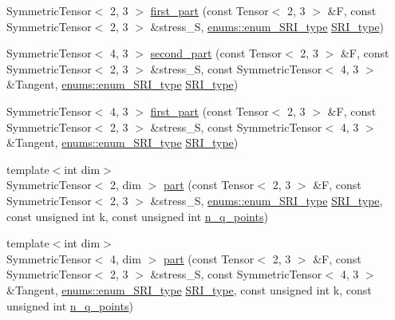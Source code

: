 \begin{DoxyCompactItemize}
\item 
Symmetric\+Tensor$<$ 2, 3 $>$ \hyperlink{namespaceSRI_a99b236a4dfdbad69d9bc9473d1110801}{first\+\_\+part} (const Tensor$<$ 2, 3 $>$ \&F, const Symmetric\+Tensor$<$ 2, 3 $>$ \&stress\+\_\+S, \hyperlink{namespaceenums_ad159a7d6539f111883db3b07c09601a8}{enums\+::enum\+\_\+\+S\+R\+I\+\_\+type} \hyperlink{assembly__routine__SRI_8cc_a163566963ded80f68a5bbc6d04ce0adf}{S\+R\+I\+\_\+type})
\item 
Symmetric\+Tensor$<$ 4, 3 $>$ \hyperlink{namespaceSRI_a59dcf1c9d3d602b0d3d3044c23cb2f10}{second\+\_\+part} (const Tensor$<$ 2, 3 $>$ \&F, const Symmetric\+Tensor$<$ 2, 3 $>$ \&stress\+\_\+S, const Symmetric\+Tensor$<$ 4, 3 $>$ \&Tangent, \hyperlink{namespaceenums_ad159a7d6539f111883db3b07c09601a8}{enums\+::enum\+\_\+\+S\+R\+I\+\_\+type} \hyperlink{assembly__routine__SRI_8cc_a163566963ded80f68a5bbc6d04ce0adf}{S\+R\+I\+\_\+type})
\item 
Symmetric\+Tensor$<$ 4, 3 $>$ \hyperlink{namespaceSRI_a7893737600c5ccd2b127e19c13a1d516}{first\+\_\+part} (const Tensor$<$ 2, 3 $>$ \&F, const Symmetric\+Tensor$<$ 2, 3 $>$ \&stress\+\_\+S, const Symmetric\+Tensor$<$ 4, 3 $>$ \&Tangent, \hyperlink{namespaceenums_ad159a7d6539f111883db3b07c09601a8}{enums\+::enum\+\_\+\+S\+R\+I\+\_\+type} \hyperlink{assembly__routine__SRI_8cc_a163566963ded80f68a5bbc6d04ce0adf}{S\+R\+I\+\_\+type})
\item 
{\footnotesize template$<$int dim$>$ }\\Symmetric\+Tensor$<$ 2, dim $>$ \hyperlink{namespaceSRI_a3d489ecd63fbd10aeb4a72281196baca}{part} (const Tensor$<$ 2, 3 $>$ \&F, const Symmetric\+Tensor$<$ 2, 3 $>$ \&stress\+\_\+S, \hyperlink{namespaceenums_ad159a7d6539f111883db3b07c09601a8}{enums\+::enum\+\_\+\+S\+R\+I\+\_\+type} \hyperlink{assembly__routine__SRI_8cc_a163566963ded80f68a5bbc6d04ce0adf}{S\+R\+I\+\_\+type}, const unsigned int k, const unsigned int \hyperlink{assembly__routine__SRI_8cc_afd52b693751274175b93a58458201e6b}{n\+\_\+q\+\_\+points})
\item 
{\footnotesize template$<$int dim$>$ }\\Symmetric\+Tensor$<$ 4, dim $>$ \hyperlink{namespaceSRI_a206b72c5652b68159cb0211c53bc9f5c}{part} (const Tensor$<$ 2, 3 $>$ \&F, const Symmetric\+Tensor$<$ 2, 3 $>$ \&stress\+\_\+S, const Symmetric\+Tensor$<$ 4, 3 $>$ \&Tangent, \hyperlink{namespaceenums_ad159a7d6539f111883db3b07c09601a8}{enums\+::enum\+\_\+\+S\+R\+I\+\_\+type} \hyperlink{assembly__routine__SRI_8cc_a163566963ded80f68a5bbc6d04ce0adf}{S\+R\+I\+\_\+type}, const unsigned int k, const unsigned int \hyperlink{assembly__routine__SRI_8cc_afd52b693751274175b93a58458201e6b}{n\+\_\+q\+\_\+points})

\end{DoxyCompactItemize}
